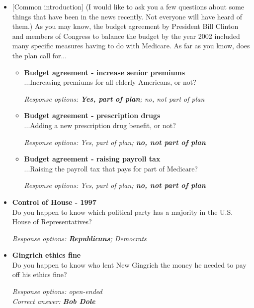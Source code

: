 \documentclass[12pt, letterpaper]{article}
\begin{document}
\begin{itemize}
\item {[Common introduction] (I would like to ask you a few questions about some things that have been in the news recently. Not everyone will have heard of them.) As you may know, the budget agreement by President Bill Clinton and members of Congress to balance the budget by the year 2002 included many specific measures having to do with Medicare. As far as you know, does the plan call for...

   \begin{itemize}
\item \textbf{Budget agreement - increase senior premiums} \\
...Increasing premiums for all elderly Americans, or not?

\textit{Response options: \textbf{Yes, part of plan}; no, not part of plan} 
\end{itemize}

   \begin{itemize}
\item \textbf{Budget agreement - prescription drugs} \\
...Adding a new prescription drug benefit, or not?

\textit{Response options: Yes, part of plan; \textbf{no, not part of plan}} 
\end{itemize}

   \begin{itemize}
\item \textbf{Budget agreement - raising payroll tax} \\
...Raising the payroll tax that pays for part of Medicare?

\textit{Response options: Yes, part of plan; \textbf{no, not part of plan}} 
\end{itemize}}
\end{itemize}

   \begin{itemize}
\item \textbf{Control of House - 1997} \\
Do you happen to know which political party has a majority in the U.S. House of Representatives?

\textit{Response options: \textbf{Republicans}; Democrats} 
\end{itemize}

   \begin{itemize}
\item \textbf{Gingrich ethics fine} \\
Do you happen to know who lent New Gingrich the money he needed to pay off his ethics fine?

\textit{Response options: open-ended} \\
\textit{Correct answer: \textbf{Bob Dole}} 
\end{itemize}
\end{document}
